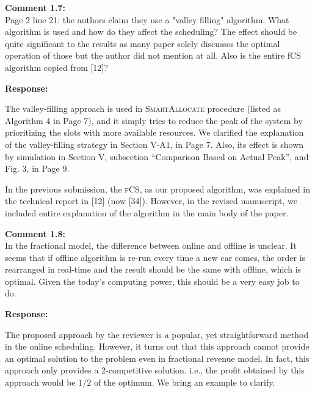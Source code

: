 \documentclass[11pt]{article}
\newcommand{\fcs}{\textsc{fCS}\xspace}
\begin{document}
\vspace{5mm}
{
{\color{blue}\noindent\textbf{Comment 1.7:}\\
Page 2 line 21: the authors claim they use a "valley filling" algorithm. What algorithm is used and how do they affect the scheduling? The effect should be quite significant to the results as many paper solely discusses the optimal operation of those but the author did not mention at all. Also is the entire fCS algorithm copied from [12]?
}}

\vspace{5mm}
\noindent\textbf{Response:}

The valley-filling approach is used in \textsc{SmartAllocate} procedure (listed as Algorithm 4 in Page 7), and it simply tries  to reduce the peak of the system by prioritizing the slots with more available resources. We clarified the explanation of the valley-filling strategy in Section V-A1, in Page 7. Also, its effect is shown by simulation in Section V, subsection ``Comparison Based on Actual Peak'', and Fig. 3, in Page 9. 

In the previous submission, the \fcs, as our proposed algorithm, was explained in the technical report in [12] (now [34]). However, in the revised manuscript, we included entire explanation of the algorithm in the main body of the paper. 


\vspace{5mm}
{
{\color{blue}\noindent\textbf{Comment 1.8:}\\
In the fractional model, the difference between online and offline is unclear. It seems that if offline algorithm is re-run every time a new car comes, the order is rearranged in real-time and the result should be the same with offline, which is optimal. Given the today's computing power, this should be a very easy job to do.
}}

\vspace{5mm}
\noindent\textbf{Response:}

The proposed approach by the reviewer is a popular, yet straightforward method in the online scheduling. However, it turns out that this approach cannot provide an optimal solution to the problem even in fractional revenue model. In fact, this approach only provides a 2-competitive solution. i.e., the profit obtained by this approach would be $1/2$ of the optimum. We bring an example to clarify.
\end{document}
